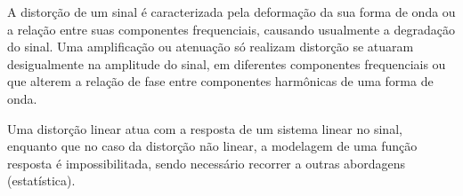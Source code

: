 \begin{subquestion}
    \item A distorção de um sinal é caracterizada pela deformação da sua forma de onda ou a relação entre suas componentes frequenciais, causando usualmente a degradação do sinal. Uma amplificação ou atenuação só realizam distorção se atuaram desigualmente na amplitude do sinal, em diferentes componentes frequenciais ou que alterem a relação de fase entre componentes harmônicas de uma forma de onda.
    \item Uma distorção linear atua com a resposta de um sistema linear no sinal, enquanto que no caso da distorção não linear, a modelagem de uma função resposta é impossibilitada, sendo necessário recorrer a outras abordagens (estatística).
\end{subquestion}
